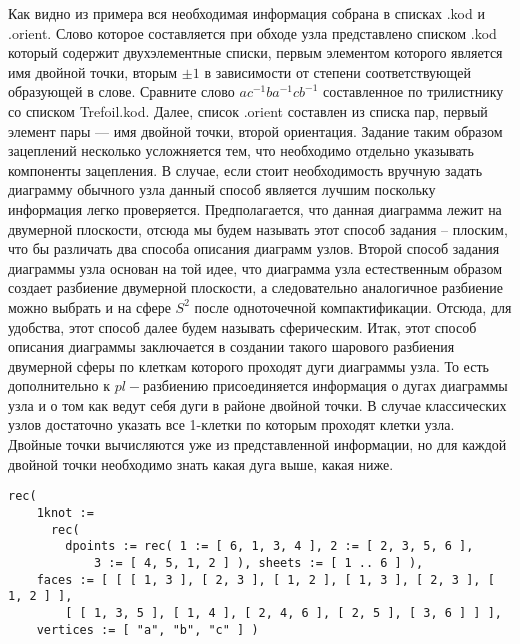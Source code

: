 \documentclass[a4paper,11pt]{report}
\begin{document}
{{{\begin{Verbatim}[commandchars=!@|,fontsize=\small,frame=single,label=Example]
\end{Verbatim}
 Как
видно
из
примера
вся
необходимая
информация
собрана
в
списках
.kod и .orient.
Слово
которое
составляется
при
обходе
узла
представлено
списком
.kod
который
содержит
двухэлементные
списки,
первым
элементом
которого
является
имя
двойной
точки,
вторым $\pm 1$ в
зависимости
от
степени
соответствующей
образующей
в
слове.
Сравните
слово $ac^{-1}ba^{-1}cb^{-1}$ составленное
по
трилистнику
со
списком
Trefoil.kod.
Далее,
список
.orient
составлен
из
списка
пар,
первый
элемент
пары ---
имя
двойной
точки,
второй
ориентация.  Задание
таким
образом
зацеплений
несколько
усложняется
тем,
что
необходимо
отдельно
указывать
компоненты
зацепления.
В
случае,
если
стоит
необходимость
вручную
задать
диаграмму
обычного
узла
данный
способ
является
лучшим
поскольку
информация
легко
проверяется.
Предполагается,
что
данная
диаграмма
лежит
на
двумерной
плоскости,
отсюда
мы
будем
называть
этот
способ
задания
--
плоским,
что бы
различать
два
способа
описания
диаграмм
узлов.
Второй
способ
задания
диаграммы
узла
основан
на той
идее,
что
диаграмма
узла
естественным
образом
создает
разбиение
двумерной
плоскости,
а
следовательно
аналогичное
разбиение
можно
выбрать
и на
сфере $S^2$ после
одноточечной
компактификации.
Отсюда,
для
удобства,
этот
способ
далее
будем
называть
сферическим.
Итак,
этот
способ
описания
диаграммы
заключается
в
создании
такого
шарового
разбиения
двумерной
сферы
по
клеткам
которого
проходят
дуги
диаграммы
узла.
То
есть
дополнительно
к $pl-$разбиению
присоединяется
информация
о
дугах
диаграммы
узла и
о том
как
ведут
себя
дуги в
районе
двойной
точки.
В
случае
классических
узлов
достаточно
указать
все
1-клетки
по
которым
проходят
клетки
узла.
Двойные
точки
вычисляются
уже из
представленной
информации,
но для
каждой
двойной
точки
необходимо
знать
какая
дуга
выше,
какая
ниже. 
\begin{Verbatim}[commandchars=!@|,fontsize=\small,frame=single,label=Example]
  rec(
    1knot :=
      rec(
        dpoints := rec( 1 := [ 6, 1, 3, 4 ], 2 := [ 2, 3, 5, 6 ],
            3 := [ 4, 5, 1, 2 ] ), sheets := [ 1 .. 6 ] ),
    faces := [ [ [ 1, 3 ], [ 2, 3 ], [ 1, 2 ], [ 1, 3 ], [ 2, 3 ], [ 1, 2 ] ],
        [ [ 1, 3, 5 ], [ 1, 4 ], [ 2, 4, 6 ], [ 2, 5 ], [ 3, 6 ] ] ],
    vertices := [ "a", "b", "c" ] )
  			

\end{Verbatim}}}}
\end{document}
